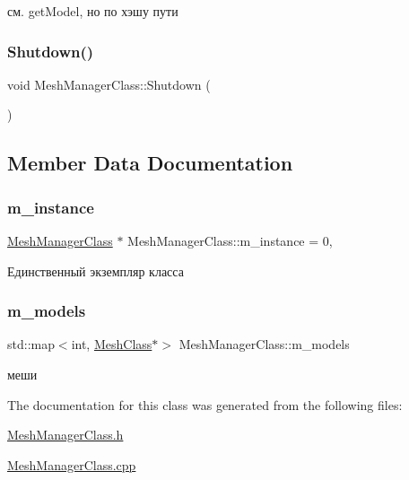 см. get\+Model, но по хэшу пути 

\mbox{\label{class_mesh_manager_class_a65269ec3ad4c2295fd5a45c78aebdefb}} 
\subsubsection{\texorpdfstring{Shutdown()}{Shutdown()}}
{\footnotesize\ttfamily void Mesh\+Manager\+Class\+::\+Shutdown (\begin{DoxyParamCaption}{ }\end{DoxyParamCaption})}



\subsection{Member Data Documentation}
\mbox{\label{class_mesh_manager_class_a9d8f0b9a7d3613a52de123401863e0d0}} 
\subsubsection{\texorpdfstring{m\+\_\+instance}{m\_instance}}
{\footnotesize\ttfamily \hyperlink{class_mesh_manager_class}{Mesh\+Manager\+Class} $\ast$ Mesh\+Manager\+Class\+::m\+\_\+instance = 0\hspace{0.3cm}{\ttfamily [static]}, {\ttfamily [private]}}



Единственный экземпляр класса 

\mbox{\label{class_mesh_manager_class_a9b067aa5baf931abddbf9c47f5ab6b43}} 
\subsubsection{\texorpdfstring{m\+\_\+models}{m\_models}}
{\footnotesize\ttfamily std\+::map$<$int, \hyperlink{class_mesh_class}{Mesh\+Class}$\ast$$>$ Mesh\+Manager\+Class\+::m\+\_\+models\hspace{0.3cm}{\ttfamily [private]}}



меши 



The documentation for this class was generated from the following files\+:\begin{DoxyCompactItemize}
\item 
\hyperlink{_mesh_manager_class_8h}{Mesh\+Manager\+Class.\+h}\item 
\hyperlink{_mesh_manager_class_8cpp}{Mesh\+Manager\+Class.\+cpp}\end{DoxyCompactItemize}
